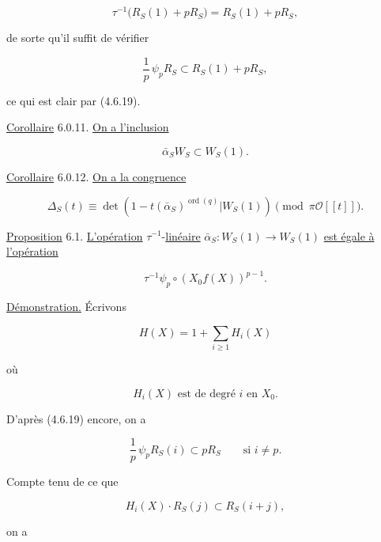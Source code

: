 \begin{equation}\tag{6.0.9}
\tau^{-1}\bigl(R_S(1)+pR_S\bigr)=R_S(1)+pR_S,
\end{equation}

de sorte qu'il suffit de vérifier

\begin{equation}\tag{6.0.10}
\frac1p\,\psi_pR_S\subset R_S(1)+pR_S,
\end{equation}

ce qui est clair par (4.6.19).

\underline{Corollaire} 6.0.11.
\underline{On a l'inclusion}

\[
\bar\alpha_S W_S\subset W_S(1).
\]


\underline{Corollaire} 6.0.12.
\underline{On a la congruence}

\[
\Delta_S(t)\equiv
\det\!\left(
1-t(\bar\alpha_S)^{\operatorname{ord}(q)}
\mathrel{\Big|}W_S(1)\right)
\pmod{\pi\mathcal O[[t]]}.
\]

\underline{Proposition} 6.1.
\underline{L'opération} $\tau^{-1}$-\underline{linéaire}
$\bar\alpha_S:W_S(1)\to W_S(1)$ \underline{est égale à l'opération}

\begin{equation}\tag{6.1.1}
\tau^{-1}\psi_p\circ(X_0f(X))^{p-1}.
\end{equation}

\underline{Démonstration.}
Écrivons

\begin{equation}\tag{6.1.2}
H(X)=1+\sum_{i\geq1}H_i(X)
\end{equation}

où

\begin{equation}\tag{6.1.3}
H_i(X)\text{ est de degré $i$ en $X_0$}.
\end{equation}

D'après (4.6.19) encore, on a

\begin{equation}\tag{6.1.4}
\frac1p\,\psi_pR_S(i)\subset pR_S
\qquad\text{si }i\ne p.
\end{equation}

Compte tenu de ce que

\begin{equation}\tag{6.1.5}
H_i(X)\cdot R_S(j)\subset R_S(i+j),
\end{equation}

on a

